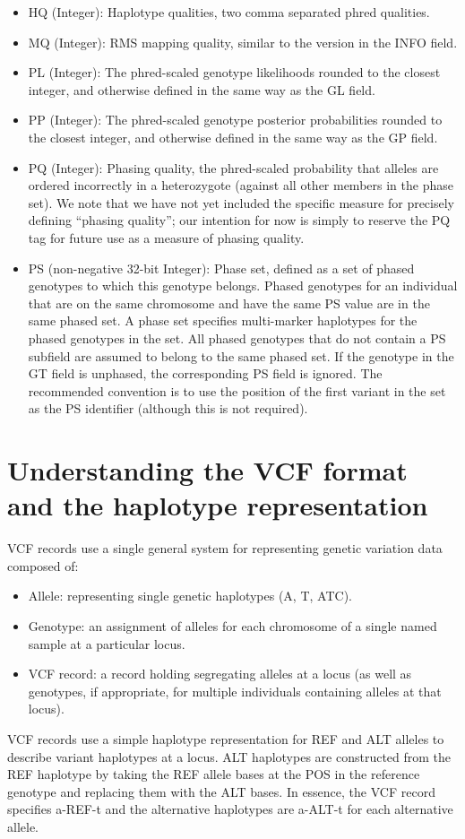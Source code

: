 \documentclass[8pt]{article}
\begin{document}
\begin{itemize}
  \item HQ (Integer): Haplotype qualities, two comma separated phred qualities.
  \item MQ (Integer): RMS mapping quality, similar to the version in the INFO field.
  \item PL (Integer): The phred-scaled genotype likelihoods rounded to the closest integer, and otherwise defined in the same way as the GL field.
  \item PP (Integer): The phred-scaled genotype posterior probabilities rounded to the closest integer, and otherwise defined in the same way as the GP field.
  \item PQ (Integer): Phasing quality, the phred-scaled probability that alleles are ordered incorrectly in a heterozygote (against all other members in the phase set).
  We note that we have not yet included the specific measure for precisely defining ``phasing quality''; our intention for now is simply to reserve the PQ tag for future use as a measure of phasing quality.
  \item PS (non-negative 32-bit Integer): Phase set, defined as a set of phased genotypes to which this genotype belongs.
  Phased genotypes for an individual that are on the same chromosome and have the same PS value are in the same phased set.
  A phase set specifies multi-marker haplotypes for the phased genotypes in the set.
  All phased genotypes that do not contain a PS subfield are assumed to belong to the same phased set.
  If the genotype in the GT field is unphased, the corresponding PS field is ignored.
  The recommended convention is to use the position of the first variant in the set as the PS identifier (although this is not required).
\end{itemize}


\section{Understanding the VCF format and the haplotype representation}
\label{haplotype-representation}
VCF records use a single general system for representing genetic variation data composed of:
\begin{itemize}
  \item Allele: representing single genetic haplotypes (A, T, ATC).
  \item Genotype: an assignment of alleles for each chromosome of a single named sample at a particular locus.
  \item VCF record: a record holding segregating alleles at a locus (as well as genotypes, if appropriate, for multiple individuals containing alleles at that locus).
\end{itemize}
VCF records use a simple haplotype representation for REF and ALT alleles to describe variant haplotypes at a locus.
ALT haplotypes are constructed from the REF haplotype by taking the REF allele bases at the POS in the reference genotype and replacing them with the ALT bases.
In essence, the VCF record specifies a-REF-t and the alternative haplotypes are a-ALT-t for each alternative allele.
\end{document}
